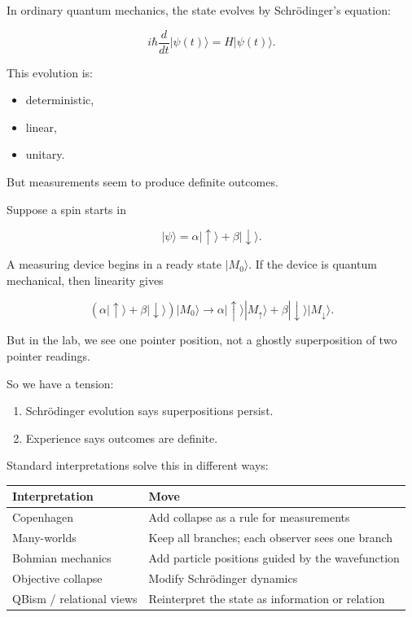 \documentclass[11pt,a4paper]{article}
\begin{document}
In ordinary quantum mechanics, the state evolves by Schrödinger’s equation:

\[
i\hbar \frac{d}{dt}|\psi(t)\rangle = H|\psi(t)\rangle.
\]

This evolution is:

\begin{itemize}
  \item deterministic,
  \item linear,
  \item unitary.
\end{itemize}

But measurements seem to produce definite outcomes.

Suppose a spin starts in

\[
|\psi\rangle = \alpha |\uparrow\rangle + \beta |\downarrow\rangle.
\]

A measuring device begins in a ready state $|M_0\rangle$. If the device is quantum mechanical, then linearity gives

\[
(\alpha|\uparrow\rangle+\beta|\downarrow\rangle)|M_0\rangle
\longrightarrow
\alpha|\uparrow\rangle|M_\uparrow\rangle
+
\beta|\downarrow\rangle|M_\downarrow\rangle.
\]

But in the lab, we see one pointer position, not a ghostly superposition of two pointer readings.

So we have a tension:

\begin{enumerate}
  \item Schrödinger evolution says superpositions persist.
  \item Experience says outcomes are definite.
\end{enumerate}

Standard interpretations solve this in different ways:

\begin{center}
\small
\begin{tabularx}{\linewidth}{|Y|Y|}
\hline
\textbf{Interpretation} & \textbf{Move} \\
\hline
Copenhagen & Add collapse as a rule for measurements \\
\hline
Many-worlds & Keep all branches; each observer sees one branch \\
\hline
Bohmian mechanics & Add particle positions guided by the wavefunction \\
\hline
Objective collapse & Modify Schrödinger dynamics \\
\hline
QBism / relational views & Reinterpret the state as information or relation \\
\hline
\end{tabularx}
\end{center}
\end{document}
